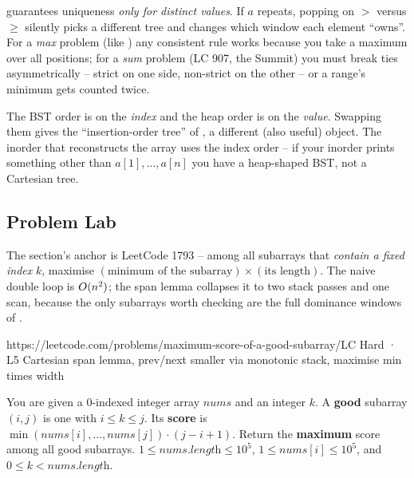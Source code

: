 \begin{warningbox}
 guarantees uniqueness \emph{only for distinct values}. If $a$ repeats, popping on
$>$ versus $\ge$ silently picks a different tree and changes which window each element ``owns''. For a
\emph{max} problem (like ) any consistent rule works because you take a maximum
over all positions; for a \emph{sum} problem (LC 907, the Summit) you must break ties asymmetrically --
strict on one side, non-strict on the other -- or a range's minimum gets counted twice.
\end{warningbox}

\begin{warningbox}
The BST order is on the \emph{index} and the heap order is on the \emph{value}. Swapping them gives the
``insertion-order tree'' of , a different (also useful) object. The inorder that
reconstructs the array uses the index order -- if your inorder prints something other than
$a[1],\dots,a[n]$ you have a heap-shaped BST, not a Cartesian tree.
\end{warningbox}

\subsection{Problem Lab}

The section's anchor is LeetCode 1793 -- among all subarrays that \emph{contain a fixed index} $k$,
maximise $(\text{minimum of the subarray}) \times (\text{its length})$. The naive double loop is
$O(n^2)$; the span lemma collapses it to two stack passes and one scan, because the only subarrays
worth checking are the full dominance windows of .

  {https://leetcode.com/problems/maximum-score-of-a-good-subarray/}{LC Hard · L5}
  {Cartesian span lemma, prev/next smaller via monotonic stack, maximise min times width}

\begin{problemstatement}
You are given a $0$-indexed integer array $\mathit{nums}$ and an integer $k$. A \textbf{good} subarray
$(i, j)$ is one with $i \le k \le j$. Its \textbf{score} is
$\min(\mathit{nums}[i], \dots, \mathit{nums}[j]) \cdot (j - i + 1)$. Return the \textbf{maximum} score
among all good subarrays. $1 \le \mathit{nums.\text{length}} \le 10^{5}$, $1 \le \mathit{nums}[i] \le 10^{5}$,
and $0 \le k < \mathit{nums.\text{length}}$.
\end{problemstatement}

